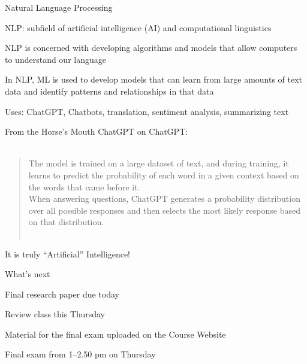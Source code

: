 \documentclass{./../div_teaching_slides}
\begin{document}
\begin{frame}{Natural Language Processing}
\begin{witemize}
  \item NLP: subfield of artificial intelligence (AI) and computational linguistics
  \item NLP is concerned with developing algorithms and models that allow computers to understand our language
  \item In NLP, ML is used to develop models that can learn from large amounts of text data and identify patterns and relationships in that data
  \item Uses: ChatGPT, Chatbots, translation, sentiment analysis, summarizing text
\end{witemize}
\end{frame}

\begin{frame}{From the Horse's Mouth}
ChatGPT on ChatGPT: \\~\\
\begin{quote}
The model is trained on a large dataset of text, and during training, it learns to predict the probability of each word in a given context based on the words that came before it. \\ \vspace{0.5em}
When answering questions, ChatGPT generates a probability distribution over all possible responses and then selects the most likely response based on that distribution. \\~\\
\end{quote}
It is truly ``Artificial'' Intelligence!
\end{frame}

\begin{frame}{What's next}
\begin{witemize}
  \item Final research paper due today
  \item Review class this Thursday 
  \item Material for the final exam uploaded on the Course Website
  \item Final exam from 1--2.50 pm on Thursday 
\end{witemize}

\end{frame}
\end{document}
